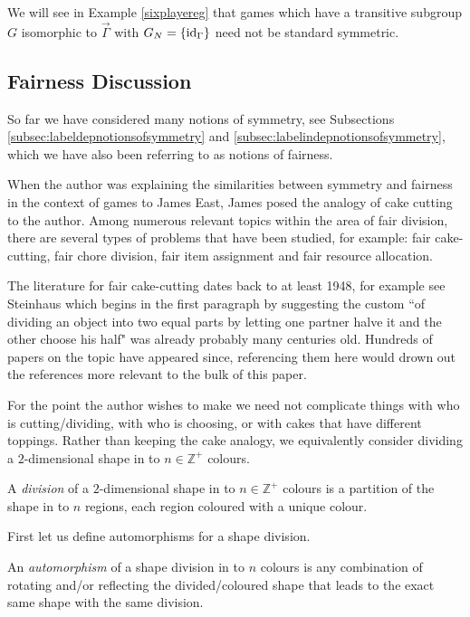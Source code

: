 We will see in Example \ref{sixplayereg} that games which have a transitive subgroup $G$ isomorphic to $\overrightarrow{\Gamma}$ with $G_N = \{\text{id}_{\Gamma}\}$ need not be standard symmetric. 

\subsection{Fairness Discussion} \label{subsec:fairnessdiscussion}
So far we have considered many notions of symmetry, see Subsections \ref{subsec:labeldepnotionsofsymmetry} and \ref{subsec:labelindepnotionsofsymmetry}, which we have also been referring to as notions of fairness. 

When the author was explaining the similarities between symmetry and fairness in the context of games to James East, James posed the analogy of cake cutting to the author. Among numerous relevant topics within the area of fair division, there are several types of problems that have been studied, for example: fair cake-cutting, fair chore division, fair item assignment and fair resource allocation.

The literature for fair cake-cutting dates back to at least 1948, for example see Steinhaus \cite{Steinhauscakecutting} which begins in the first paragraph by suggesting the custom ``of dividing an object into two equal parts by letting one partner halve it and the other choose his half" was already probably many centuries old. Hundreds of papers on the topic have appeared since, referencing them here would drown out the references more relevant to the bulk of this paper. 

For the point the author wishes to make we need not complicate things with who is cutting/dividing, with who is choosing, or with cakes that have different toppings. Rather than keeping the cake analogy, we equivalently consider dividing a $2$-dimensional shape in to $n \in \mathbb{Z}^+$ colours. 

\begin{definition}
	A \textit{division} of a $2$-dimensional shape in to $n \in \mathbb{Z}^+$ colours is a partition of the shape in to $n$ regions, each region coloured with a unique colour. 
\end{definition}

First let us define automorphisms for a shape division.

\begin{definition}
	An \textit{automorphism} of a shape division in to $n$ colours is any combination of rotating and/or reflecting the divided/coloured shape that leads to the exact same shape with the same division. 
\end{definition}

